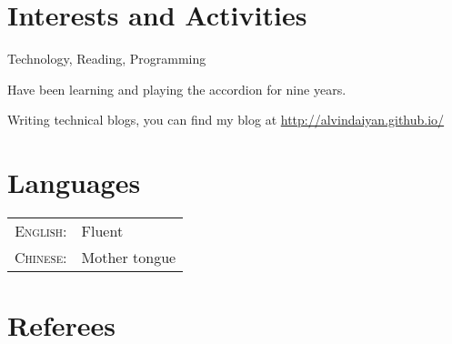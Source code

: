 \documentclass[a4paper,10pt]{article} %
\begin{document}

\section{Interests and Activities}
Technology, Reading, Programming

Have been learning and playing the accordion for nine years.

Writing technical blogs, you can find my blog at \href{http://alvindaiyan.github.io/}{http://alvindaiyan.github.io/}


\section{Languages}

\begin{tabular}{rl}
\textsc{English:} & Fluent\\

\textsc{Chinese:} & Mother tongue\\
\end{tabular}


\section{Referees}
\end{document}
